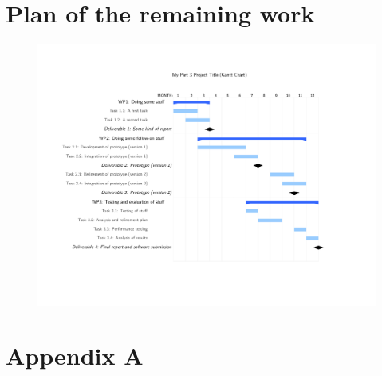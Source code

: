 \documentclass[sotoncolour]{extra/uosproject}     %
\begin{document}
\section{Plan of the remaining work}
\begin{figure}
    \centering
    \includegraphics{future_work_grantt/future_grantt}
    \caption{}
    \label{fig:future_grantt}
\end{figure}

\backmatter

\appendix
\section*{Appendix A}\label{app:aamas_paper} %











\end{document}
